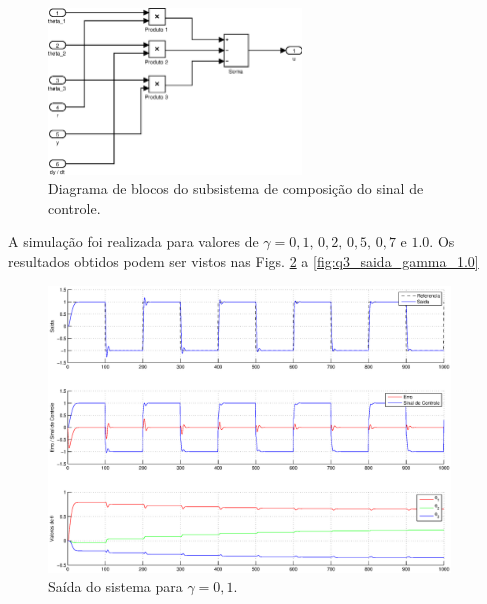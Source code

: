 \begin{figure}[H]
    \centering
    \includegraphics[width=0.6\textwidth]{imgs/questao3/sinal_controle}
    \caption{Diagrama de blocos do subsistema de composição do sinal de
             controle.}
    \label{fig:q3_sinal_cont}
\end{figure}

A simulação foi realizada para valores de $\gamma = 0,1\text{, } 0,2\text{, }
0,5\text{, } 0,7 \text{ e } 1.0$. Os resultados obtidos podem ser vistos nas
Figs. \ref{fig:q3_saida_gamma_0.1} a \ref{fig:q3_saida_gamma_1.0}

\begin{figure}[htb]
    \centering
    \includegraphics[width=0.95\textwidth]{imgs/questao3/saida_gamma_0.1.eps}
    \caption{Saída do sistema para $\gamma = 0,1$.}
    \label{fig:q3_saida_gamma_0.1}
\end{figure}

